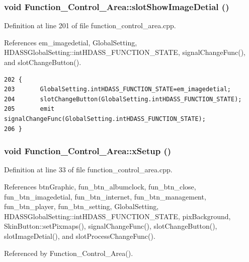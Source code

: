 \subsubsection{\setlength{\rightskip}{0pt plus 5cm}void Function\_\-Control\_\-Area::slot\-Show\-Image\-Detial ()\hspace{0.3cm}{\tt  [slot]}}\label{classFunction__Control__Area_Function__Control__Areai3}




Definition at line 201 of file function\_\-control\_\-area.cpp.

References em\_\-imagedetial, Global\-Setting, HDASSGlobal\-Setting::int\-HDASS\_\-FUNCTION\_\-STATE, signal\-Change\-Func(), and slot\-Change\-Button().



\footnotesize\begin{verbatim}202 {
203       GlobalSetting.intHDASS_FUNCTION_STATE=em_imagedetial;
204       slotChangeButton(GlobalSetting.intHDASS_FUNCTION_STATE);
205       emit signalChangeFunc(GlobalSetting.intHDASS_FUNCTION_STATE);
206 }
\end{verbatim}\normalsize 
{}
\subsubsection{\setlength{\rightskip}{0pt plus 5cm}void Function\_\-Control\_\-Area::x\-Setup ()}\label{classFunction__Control__Area_Function__Control__Areaa1}




Definition at line 33 of file function\_\-control\_\-area.cpp.

References btn\-Graphic, fun\_\-btn\_\-albumclock, fun\_\-btn\_\-close, fun\_\-btn\_\-imagedetial, fun\_\-btn\_\-internet, fun\_\-btn\_\-management, fun\_\-btn\_\-player, fun\_\-btn\_\-setting, Global\-Setting, HDASSGlobal\-Setting::int\-HDASS\_\-FUNCTION\_\-STATE, pix\-Background, Skin\-Button::set\-Pixmaps(), signal\-Change\-Func(), slot\-Change\-Button(), slot\-Image\-Detial(), and slot\-Process\-Change\-Func().

Referenced by Function\_\-Control\_\-Area().



